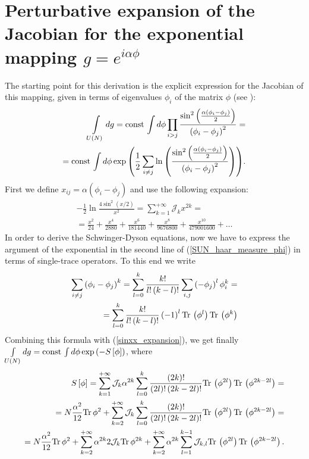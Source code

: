 \documentclass[12pt]{article}
\newcommand{\lr}[1]{ \left( #1 \right) }
\newcommand{\lrs}[1]{ \left[ #1 \right] }
\newcommand{\tr}{ {\rm Tr} \, }
\newcommand{\const}{ {\rm const}}
\newcommand{\expa}[1]{ \exp{\left( #1 \right)} }
\begin{document}
\section{Perturbative expansion of the Jacobian for the exponential mapping $g = e^{i \alpha \phi}$}
\label{sec:exp_J_pert}

 The starting point for this derivation is the explicit expression for the Jacobian of this mapping, given in terms of eigenvalues $\phi_i$ of the matrix $\phi$ (see \cite{Buividovich:15:3}):
\begin{eqnarray}
\label{SUN_haar_measure_phi}
 \int\limits_{U\lr{N}} dg
 =
 \const \, \int d\phi
 \prod\limits_{i > j}
 \frac{\sin^2\lr{\frac{\alpha \lr{\phi_i - \phi_j}}{2}}}{\lr{\phi_i - \phi_j}^2}
 = \nonumber \\ =
 \const \, \int d\phi
 \expa{\frac{1}{2} \sum\limits_{i \neq j} \ln\lr{\frac{\sin^2\lr{\frac{\alpha \lr{\phi_i - \phi_j}}{2}} }{\lr{\phi_i - \phi_j}^2}} } .
\end{eqnarray}
First we define $x_{ij} = \alpha\lr{\phi_i - \phi_j}$ and use the following expansion:
\begin{eqnarray}
\label{sinxx_expansion}
 -\frac{1}{2} \ln \frac{4 \sin^2\lr{x/2}}{x^2} =
 \sum\limits_{k=1}^{+\infty} \mathcal{J}_k x^{2 k}
 = \nonumber \\ =
 \frac{x^2}{24}+\frac{x^4}{2880}+\frac{x^6}{181440}+\frac{x^8}{9676800}+\frac{x^{10}}{479001600} + \ldots
\end{eqnarray}
In order to derive the Schwinger-Dyson equations, now we have to express the argument of the exponential in the second line of (\ref{SUN_haar_measure_phi}) in terms of single-trace operators.
To this end we write
\begin{eqnarray}
\label{phiiphij2traces}
 \sum\limits_{i \neq j} \lr{\phi_i - \phi_j}^k =
 \sum\limits_{l=0}^k \frac{k!}{l! \lr{k - l}!}
 \sum\limits_{i,j} \lr{-\phi_j}^l \phi_i^k
 = \nonumber \\ =
 \sum\limits_{l=0}^k \frac{k!}{l! \lr{k - l}!} \lr{-1}^l \tr\lr{\phi^l} \tr\lr{\phi^k}
\end{eqnarray}
Combining this formula with (\ref{sinxx_expansion}), we get finally $\int\limits_{U\lr{N}} dg
 = \const \, \int d\phi \expa{ - S\lrs{\phi}}$, where
\begin{eqnarray}
\label{SUN_Jacobian_action}
 S\lrs{\phi} = \sum\limits_{k=1}^{+\infty}
 \mathcal{J}_k \alpha^{2 k}
 \sum\limits_{l=0}^k \frac{\lr{2 k}!}{\lr{2 l}! \lr{2 k - 2 l}!} \tr\lr{\phi^{2 l}} \tr\lr{\phi^{2k - 2l}}
  = \nonumber \\ =
 N \frac{\alpha^2}{12} \tr\phi^2
 + \sum\limits_{k=2}^{+\infty}
 \mathcal{J}_k
 \sum\limits_{l=0}^k \frac{\lr{2 k}!}{\lr{2 l}! \lr{2 k - 2 l}!} \tr\lr{\phi^{2 l}} \tr\lr{\phi^{2k - 2l}}
 = \nonumber \\ =
 N \frac{\alpha^2}{12} \tr\phi^2
 +
 \sum\limits_{k=2}^{+\infty} \alpha^{2 k} 2 \mathcal{J}_k \tr{\phi^{2 k}}
 +
 \sum\limits_{k=2}^{+\infty} \alpha^{2 k} \sum\limits_{l=1}^{k-1}
 \mathcal{J}_{k,l} \tr\lr{\phi^{2 l}} \tr\lr{\phi^{2k - 2l}} .
\end{eqnarray}
\end{document}
